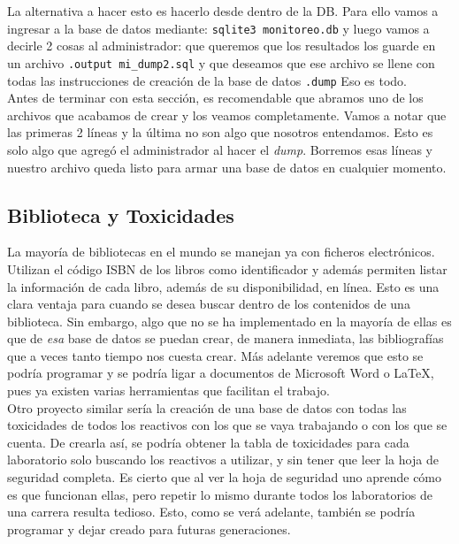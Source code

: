 \documentclass[10pt,letterpaper]{article}
\newcommand{\inlinecode}[1]{
\colorbox{light-gray}{\texttt{#1}}
}
\begin{document}
La alternativa a hacer esto es hacerlo desde dentro de la DB. Para ello vamos a ingresar a la base de datos mediante: \inlinecode{sqlite3 monitoreo.db} y luego vamos a decirle 2 cosas al administrador: que queremos que los resultados los guarde en un archivo \inlinecode{.output mi\_dump2.sql} y que deseamos que ese archivo se llene con todas las instrucciones de creaci\'on de la base de datos \inlinecode{.dump} Eso es todo.\\

Antes de terminar con esta secci\'on, es recomendable que abramos uno de los archivos que acabamos de crear y los veamos completamente. Vamos a notar que las primeras 2 l\'ineas y la \'ultima no son algo que nosotros entendamos. Esto es solo algo que agreg\'o el administrador al hacer el \emph{dump}. Borremos esas l\'ineas y nuestro archivo queda listo para armar una base de datos en cualquier momento.

\subsection{Biblioteca y Toxicidades}
La mayor\'ia de bibliotecas en el mundo se manejan ya con ficheros electr\'onicos. Utilizan el c\'odigo ISBN de los libros como identificador y adem\'as permiten listar la informaci\'on de cada libro, adem\'as de su disponibilidad, en l\'inea. Esto es una clara ventaja para cuando se desea buscar dentro de los contenidos de una biblioteca. Sin embargo, algo que no se ha implementado en la mayor\'ia de ellas es que de \emph{esa} base de datos se puedan crear, de manera inmediata, las bibliograf\'ias que a veces tanto tiempo nos cuesta crear. M\'as adelante veremos que esto se podr\'ia programar y se podr\'ia ligar a documentos de Microsoft Word o \LaTeX , pues ya existen varias herramientas que facilitan el trabajo.\\

Otro proyecto similar ser\'ia la creaci\'on de una base de datos con todas las toxicidades de todos los reactivos con los que se vaya trabajando o con los que se cuenta. De crearla as\'i, se podr\'ia obtener la tabla de toxicidades para cada laboratorio solo buscando los reactivos a utilizar, y sin tener que leer la hoja de seguridad completa. Es cierto que al ver la hoja de seguridad uno aprende c\'omo es que funcionan ellas, pero repetir lo mismo durante todos los laboratorios de una carrera resulta tedioso. Esto, como se ver\'a adelante, tambi\'en se podr\'ia programar y dejar creado para futuras generaciones.\\
\end{document}

